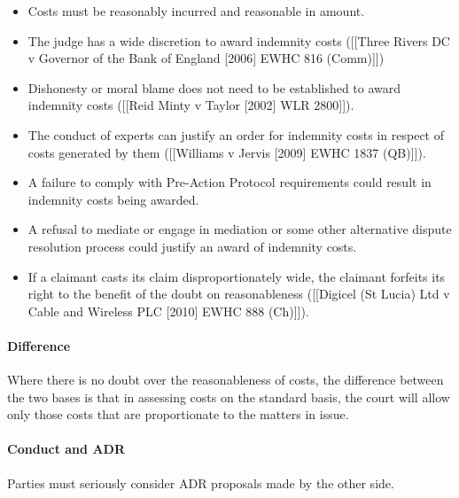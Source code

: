 \documentclass[
]{article}
\providecommand{\tightlist}{%
  \setlength{\itemsep}{0pt}\setlength{\parskip}{0pt}}
\begin{document}
\begin{itemize}
\tightlist
\item
  Costs must be reasonably incurred and reasonable in amount.
\item
  The judge has a wide discretion to award indemnity costs ({[}{[}Three
  Rivers DC v Governor of the Bank of England {[}2006{]} EWHC 816
  (Comm){]}{]})
\item
  Dishonesty or moral blame does not need to be established to award
  indemnity costs ({[}{[}Reid Minty v Taylor {[}2002{]} WLR 2800{]}{]}).
\item
  The conduct of experts can justify an order for indemnity costs in
  respect of costs generated by them ({[}{[}Williams v Jervis {[}2009{]}
  EWHC 1837 (QB){]}{]}).
\item
  A failure to comply with Pre-Action Protocol requirements could result
  in indemnity costs being awarded.
\item
  A refusal to mediate or engage in mediation or some other alternative
  dispute resolution process could justify an award of indemnity costs.
\item
  If a claimant casts its claim disproportionately wide, the claimant
  forfeits its right to the benefit of the doubt on reasonableness
  ({[}{[}Digicel (St Lucia) Ltd v Cable and Wireless PLC {[}2010{]} EWHC
  888 (Ch){]}{]}).
\end{itemize}

\hypertarget{difference}{%
\paragraph{Difference}\label{difference}}

Where there is no doubt over the reasonableness of costs, the difference
between the two bases is that in assessing costs on the standard basis,
the court will allow only those costs that are proportionate to the
matters in issue.

\hypertarget{conduct-and-adr}{%
\paragraph{Conduct and ADR}\label{conduct-and-adr}}

Parties must seriously consider ADR proposals made by the other side.
\end{document}
